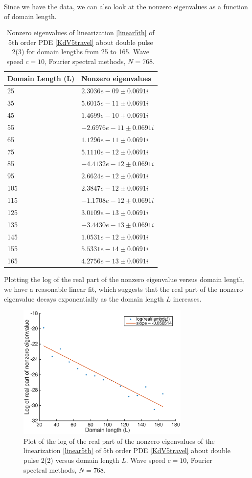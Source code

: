 \documentclass[12pt]{article}
\begin{document}
Since we have the data, we can also look at the nonzero eigenvalues as a function of domain length.

\begin{table}[H]
\begin{tabular}{l|l}
Domain Length (L)  & Nonzero eigenvalues \\ \hline
    25 &  $  2.3036e-09 \pm 0.0691i$   \\
    35 &  $  5.6015e-11 \pm 0.0691i$   \\
    45 &  $  1.4699e-10 \pm 0.0691i$   \\
    55 &  $ -2.6976e-11 \pm 0.0691i$   \\
    65 &  $  1.1296e-11 \pm 0.0691i$   \\
    75 &  $  5.1110e-12 \pm 0.0691i$   \\
    85 &  $ -4.4132e-12 \pm 0.0691i$   \\
    95 &  $  2.6624e-12 \pm 0.0691i$   \\
   105 &  $  2.3847e-12 \pm 0.0691i$   \\
   115 &  $ -1.1708e-12 \pm 0.0691i$   \\
   125 &  $  3.0109e-13 \pm 0.0691i$   \\
   135 &  $ -3.4430e-13 \pm 0.0691i$   \\
   145 &  $  1.0531e-12 \pm 0.0691i$   \\
   155 &  $  5.5331e-14 \pm 0.0691i$   \\
   165 &  $  4.2756e-13 \pm 0.0691i$   \\
\end{tabular}
\caption{Nonzero eigenvalues of linearization \eqref{linear5th} of 5th order PDE \eqref{KdV5travel} about double pulse 2(3) for domain lengths from 25 to 165. Wave speed $c = 10$, Fourier spectral methods, $N = 768$.}
\label{eigvsL}
\end{table}

Plotting the log of the real part of the nonzero eigenvalue versus domain length, we have a reasonable linear fit, which suggests that the real part of the nonzero eigenvalue decays exponentially as the domain length $L$ increases.

\begin{figure}[H]
	\includegraphics[width=8.5cm]{expdecayL}
	\caption{Plot of the log of the real part of the nonzero eigenvalues of the linearization \eqref{linear5th} of 5th order PDE \eqref{KdV5travel} about double pulse 2(2) versus domain length $L$. Wave speed $c = 10$, Fourier spectral methods, $N = 768$.}
\end{figure}
\end{document}
